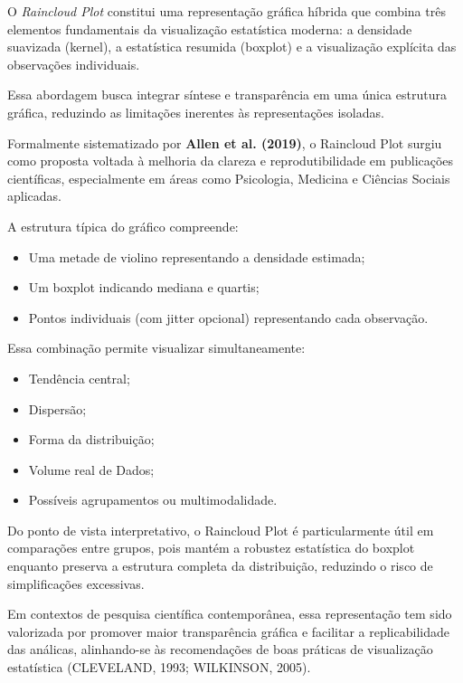 O \textit{Raincloud Plot} constitui uma representação gráfica híbrida que combina três elementos fundamentais da visualização estatística moderna: a densidade suavizada (kernel), a estatística resumida (boxplot) e a visualização explícita das observações individuais.  \vskip0.3cm

Essa abordagem busca integrar síntese e transparência em uma única estrutura gráfica, reduzindo as limitações inerentes às representações isoladas. \vskip0.3cm

Formalmente sistematizado por \textbf{Allen et al. (2019)}, o Raincloud Plot surgiu como proposta voltada à melhoria da clareza e reprodutibilidade em publicações científicas, especialmente em áreas como Psicologia, Medicina e Ciências Sociais aplicadas. \vskip0.3cm

\newpage
A estrutura típica do gráfico compreende: 

\begin{itemize}
    \item Uma metade de violino representando a densidade estimada;
    \item Um boxplot indicando mediana e quartis;
    \item Pontos individuais (com jitter opcional) representando cada observação.
\end{itemize}

Essa combinação permite visualizar simultaneamente:

\begin{itemize}
    \item Tendência central;
    \item Dispersão;
    \item Forma da distribuição;
    \item Volume real de Dados;
    \item Possíveis agrupamentos ou multimodalidade.
\end{itemize}

Do ponto de vista interpretativo, o Raincloud Plot é particularmente útil em comparações entre grupos, pois mantém a robustez estatística do boxplot enquanto preserva a estrutura completa da distribuição, reduzindo o risco de simplificações excessivas. \vskip0.3cm

Em contextos de pesquisa científica contemporânea, essa representação tem sido valorizada por promover maior transparência gráfica e facilitar a replicabilidade das análicas, alinhando-se às recomendações de boas práticas de visualização estatística (CLEVELAND, 1993; WILKINSON, 2005).




